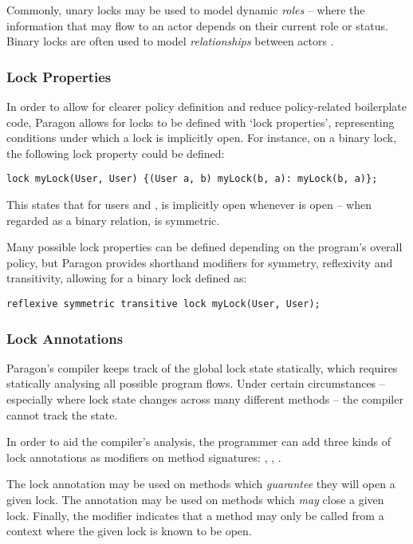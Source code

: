 Commonly, unary locks may be used to model dynamic \textit{roles} -- where the information that may flow to an actor depends on their current role or status. Binary locks are often used to model \textit{relationships} between actors \cite{broberg2013paragon}.

\subsubsection{Lock Properties}

In order to allow for clearer policy definition and reduce policy-related boilerplate code, Paragon allows for locks to be defined with `lock properties', representing conditions under which a lock is implicitly open. For instance, on a binary lock, the following lock property could be defined:

\begin{verbatim}
lock myLock(User, User) {(User a, b) myLock(b, a): myLock(b, a)};
\end{verbatim}

This states that for users  and ,  is implicitly open whenever  is open -- when regarded as a binary relation,  is symmetric.

Many possible lock properties can be defined depending on the program's overall policy, but Paragon provides shorthand modifiers for symmetry, reflexivity and transitivity, allowing for a binary lock defined as:

\begin{verbatim}
reflexive symmetric transitive lock myLock(User, User);
\end{verbatim}

\subsubsection{Lock Annotations}

Paragon's compiler keeps track of the global lock state statically, which requires statically analysing all possible program flows. Under certain circumstances -- especially where lock state changes across many different methods -- the compiler cannot track the state.

In order to aid the compiler's analysis, the programmer can add three kinds of lock annotations as modifiers on method signatures: , , .


The \mono{+} lock annotation may be used on methods which \textit{guarantee} they will open a given lock. The \mono{-} annotation may be used on methods which \textit{may} close a given lock. Finally, the \mono{\textasciitilde} modifier indicates that a method may only be called from a context where the given lock is known to be open.

